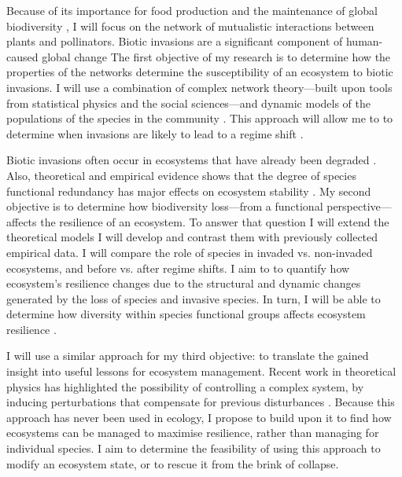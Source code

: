 \documentclass[a4paper]{report}
\begin{document}
Because of its importance for food production and the maintenance of global biodiversity \citep{Bascompte2006, Bascompte2007, Klein2007}, I will focus on the network of mutualistic interactions between plants and pollinators. 
Biotic invasions are a significant component of human-caused global change \citep{Vitousek1997}
The first objective of my research is to determine how the properties of the networks determine the susceptibility of an ecosystem to biotic invasions.
I will use a combination of complex network theory---built upon tools from statistical physics and the social sciences---and dynamic models of the populations of the species in the community \citep{Bastolla2009, Garcia-Algarra2013}. 
This approach will allow me to to determine when invasions are likely to lead to a regime shift \citep{Romanuk2009, Rohr2014, Tylianakis2014}.

Biotic invasions often occur in ecosystems that have already been degraded \citep{Bennett2015}. 
Also, theoretical and empirical evidence shows that the degree of species functional redundancy has major effects on ecosystem stability \citep{Walker1999, Fonseca2001, Bellwood2003b, Loreau2004, Allison2008, Brandl2014a}. 
My second objective is to determine how biodiversity loss---from a functional perspective---affects the resilience of an ecosystem. 
To answer that question I will extend the theoretical models I will develop and contrast them with previously collected empirical data.
I will compare the role of species in invaded vs. non-invaded ecosystems, and before vs. after regime shifts.
I aim to to quantify how ecosystem's resilience changes due to the structural and dynamic changes generated by the loss of species and invasive species.
In turn, I will be able to determine how  diversity within species functional groups affects ecosystem resilience \citep{Rohr2014}.

I will use a similar approach for my third objective: to translate the gained insight into useful lessons for ecosystem management.
Recent work in theoretical physics has highlighted the possibility of controlling a complex system, by inducing perturbations that compensate for previous disturbances \citep{Cornelius2013}.
Because this approach has never been used in ecology, I propose to build upon it to find how ecosystems can be managed to maximise resilience, rather than managing for individual species.
I aim to determine the feasibility of using this approach to modify an ecosystem state, or to rescue it from the brink of collapse.
\end{document}
